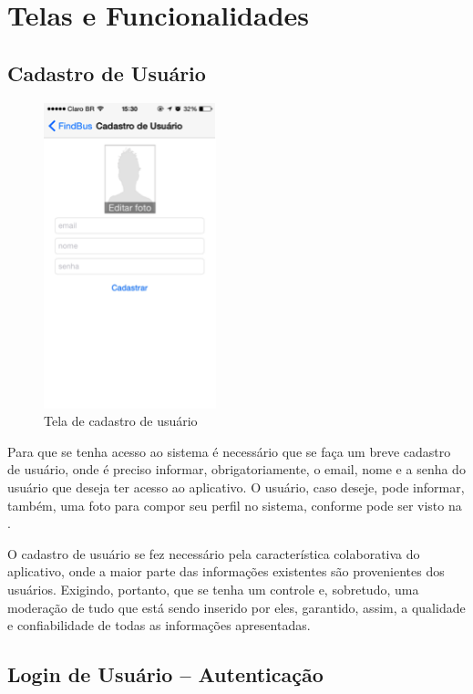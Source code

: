 \section{Telas e Funcionalidades}
\label{sc:telas}

\subsection{Cadastro de Usuário}

\begin{figure}[htp]
\begin{center}
  \includegraphics[width=5cm]{images/telas/cadastroDeUsuario.png}
  \caption{Tela de cadastro de usuário}
  \label{fig:telaCadastro}
\end{center}
\end{figure}

Para que se tenha acesso ao sistema é necessário que se faça um breve cadastro de usuário, onde é preciso informar, obrigatoriamente,  o email, nome e a senha do usuário que deseja ter acesso ao aplicativo. O usuário, caso deseje, pode informar, também, uma foto para compor seu perfil no sistema, conforme pode ser visto na .

O cadastro de usuário se fez necessário pela característica colaborativa do aplicativo, onde a maior parte das informações existentes são provenientes dos usuários. Exigindo, portanto, que se tenha um controle e, sobretudo, uma moderação de tudo que está sendo inserido por eles, garantido, assim, a qualidade e confiabilidade de todas as informações apresentadas.

\subsection{Login de Usuário – Autenticação}


